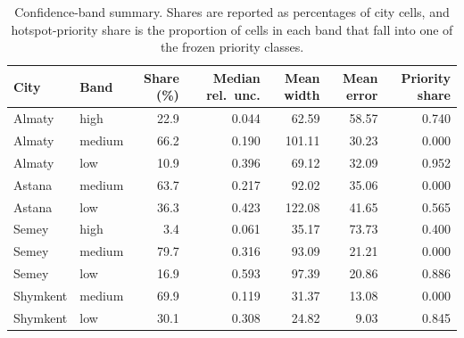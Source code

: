 \begin{table}[H]
\centering
\small
\caption{Confidence-band summary. Shares are reported as percentages of city cells, and hotspot-priority share is the proportion of cells in each band that fall into one of the frozen priority classes.}
\label{tab:confidence-bands}
\begin{tabular}{llrrrrr}
\toprule
City & Band & Share (\%) & Median rel.\ unc. & Mean width & Mean error & Priority share \\
\midrule
Almaty   & high   & 22.9 & 0.044 & 62.59  & 58.57 & 0.740 \\
Almaty   & medium & 66.2 & 0.190 & 101.11 & 30.23 & 0.000 \\
Almaty   & low    & 10.9 & 0.396 & 69.12  & 32.09 & 0.952 \\
Astana   & medium & 63.7 & 0.217 & 92.02  & 35.06 & 0.000 \\
Astana   & low    & 36.3 & 0.423 & 122.08 & 41.65 & 0.565 \\
Semey    & high   & 3.4  & 0.061 & 35.17  & 73.73 & 0.400 \\
Semey    & medium & 79.7 & 0.316 & 93.09  & 21.21 & 0.000 \\
Semey    & low    & 16.9 & 0.593 & 97.39  & 20.86 & 0.886 \\
Shymkent & medium & 69.9 & 0.119 & 31.37  & 13.08 & 0.000 \\
Shymkent & low    & 30.1 & 0.308 & 24.82  & 9.03  & 0.845 \\
\bottomrule
\end{tabular}
\end{table}

